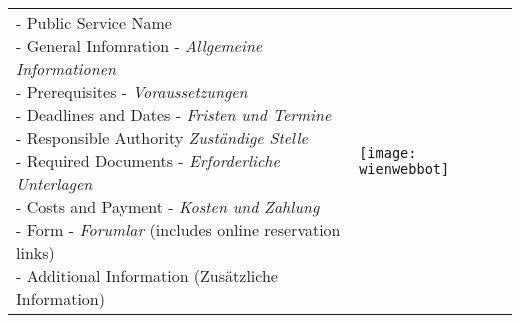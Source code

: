 \begin{table}[H]
	\begin{tabular} {l l}

\shortstack[l]{
- Public Service Name\\
- General Infomration - \textit{Allgemeine Informationen}\\
- Prerequisites - \textit{Voraussetzungen}\\
- Deadlines and Dates - \textit{Fristen und Termine}\\
- Responsible Authority \textit{Zuständige Stelle}\\
- Required Documents - \textit{Erforderliche Unterlagen}\\
- Costs and Payment - \textit{Kosten und Zahlung}\\
- Form - \textit{Forumlar} (includes online reservation links)\\
- Additional Information (Zusätzliche Information)
}

&

\texttt{[image: wienwebbot]}
	\end{tabular}	
\end{table}



%
%
%
%
%


